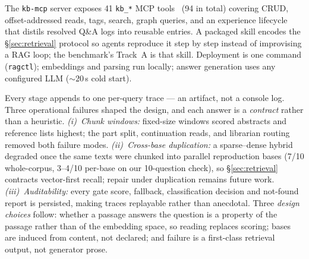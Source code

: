 The \texttt{kb-mcp} server exposes 41 \texttt{kb\_*} MCP tools~\cite{mcp} (94 in
total) covering CRUD, offset-addressed reads, tags, search, graph
queries, and an experience lifecycle that distils resolved Q\&A logs
into reusable entries. A packaged skill encodes the \S\ref{sec:retrieval}
protocol so agents reproduce it step by step instead of improvising a RAG loop;
the benchmark's Track~A is that skill. Deployment is one command
(\texttt{ragctl}); embeddings and parsing run locally; answer generation uses
any configured LLM (${\sim}20$\,s cold start).

Every stage appends to one per-query trace --- an artifact, not a
console log. Three operational failures shaped the design, and each
answer is a \emph{contract} rather than a heuristic. \emph{(i)~Chunk windows:}
fixed-size windows scored abstracts and reference lists highest; the part
split, continuation reads, and librarian routing removed both failure modes. \emph{(ii)~Cross-base duplication:} a sparse--dense hybrid degraded
once the same texts were chunked into parallel reproduction bases (7/10
whole-corpus, 3--4/10 per-base on our 10-question check), so \S\ref{sec:retrieval} contracts
vector-first recall; repair under duplication remains future work. \emph{(iii)~Auditability:} every gate score,
fallback, classification decision and not-found report is persisted, making
traces replayable rather than anecdotal. Three \emph{design choices} follow:
whether a passage answers the question is a property of the passage rather than
of the embedding space, so reading replaces scoring; bases are induced from
content, not declared; and failure is a first-class retrieval output, not
generator prose.
